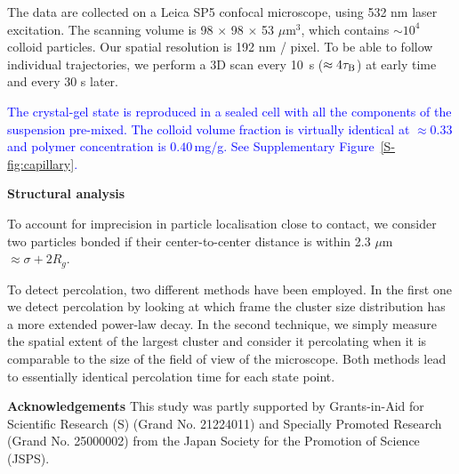 \documentclass[preprint,amsmath,amssymb,superscriptaddress]{revtex4-1}
\begin{document}
The data are collected on a Leica SP5 confocal microscope, using 532 nm laser excitation. The scanning volume is 98 $\times$ 98 $\times$ 53 $\mu$m$^3$, which contains $\sim 10^4$ colloid particles. Our spatial resolution is 192 nm / pixel. To be able to follow individual trajectories, we perform a 3D scan every 10~s ($\approx 4\tau_{\rm B}$) at early time and every 30 s later.

\textcolor{blue}{
The crystal-gel state is reproduced in a sealed cell with all the components of the suspension pre-mixed. The colloid volume fraction is virtually identical at $\approx 0.33$ and polymer concentration is $0.40\,$mg/g. See Supplementary Figure~\ref{S-fig:capillary}.}





%

\noindent
{\bf Structural analysis}

To account for imprecision in particle localisation close to contact, we consider two particles bonded if their center-to-center distance is within 2.3 $\mu$m $\approx\sigma+2R_g$.

To detect percolation, two different methods have been employed. In the first one we detect percolation
by looking at which frame the cluster size distribution has a more extended power-law decay. In the second technique,
we simply measure the spatial extent of the largest cluster and consider it percolating when it is comparable to the
size of the field of view of the microscope. Both methods lead to essentially identical percolation time for each state point.






\vspace{1cm}
\noindent
{\bf Acknowledgements} 
This study was partly supported by Grants-in-Aid for Scientific Research (S) (Grand No. 21224011) and Specially Promoted Research (Grand No. 25000002) from the Japan Society for the Promotion of Science (JSPS). 
\end{document}
